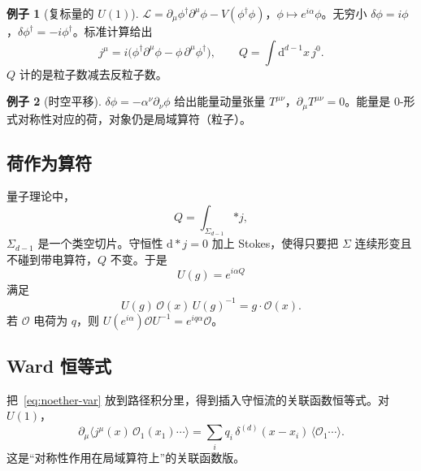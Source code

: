 \documentclass[11pt,a4paper]{article}
\theoremstyle{definition}
\newtheorem{example}{例子}[section]
\theoremstyle{plain}
\theoremstyle{remark}
\newcommand{\dd}{\mathrm{d}}
\begin{document}
\begin{example}[复标量的 $U(1)$]
$\mathcal{L}=\partial_\mu\phi^\dagger\partial^\mu\phi-V(\phi^\dagger\phi)$，$\phi\mapsto e^{i\alpha}\phi$。无穷小 $\delta\phi=i\phi$，$\delta\phi^\dagger=-i\phi^\dagger$。标准计算给出
\begin{equation}
  j^\mu=i\bigl(\phi^\dagger\partial^\mu\phi-\phi\,\partial^\mu\phi^\dagger\bigr),\qquad
  Q=\int \dd^{d-1}x\, j^0.
\end{equation}
$Q$ 计的是粒子数减去反粒子数。
\end{example}

\begin{example}[时空平移]
$\delta\phi=-\alpha^\nu\partial_\nu\phi$ 给出能量动量张量 $T^{\mu\nu}$，$\partial_\mu T^{\mu\nu}=0$。能量是 $0$-形式对称性对应的荷，对象仍是局域算符（粒子）。
\end{example}

\subsection{荷作为算符}

量子理论中，
\begin{equation}
  Q=\int_{\Sigma_{d-1}} {*j},
\end{equation}
$\Sigma_{d-1}$ 是一个类空切片。守恒性 $\dd{*}j=0$ 加上 Stokes，使得只要把 $\Sigma$ 连续形变且不碰到带电算符，$Q$ 不变。于是
\begin{equation}
  U(g)=e^{i\alpha Q}
\end{equation}
满足
\begin{equation}
\label{eq:action0}
  U(g)\,\mathcal{O}(x)\,U(g)^{-1}=g\cdot\mathcal{O}(x).
\end{equation}
若 $\mathcal{O}$ 电荷为 $q$，则 $U(e^{i\alpha})\mathcal{O}U^{-1}=e^{iq\alpha}\mathcal{O}$。

\subsection{Ward 恒等式}

把~\eqref{eq:noether-var} 放到路径积分里，得到插入守恒流的关联函数恒等式。对 $U(1)$，
\begin{equation}
  \partial_\mu\langle j^\mu(x)\,\mathcal{O}_1(x_1)\cdots\rangle
  =\sum_i q_i\,\delta^{(d)}(x-x_i)\,\langle \mathcal{O}_1\cdots\rangle.
\end{equation}
这是``对称性作用在局域算符上''的关联函数版。

\end{document}
